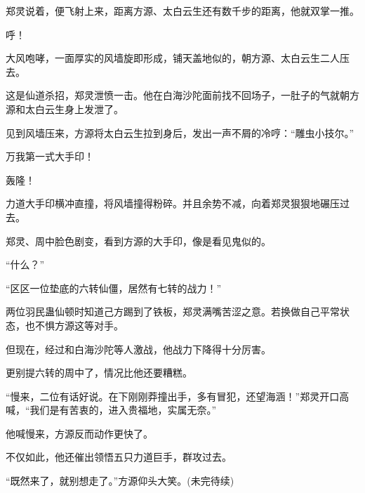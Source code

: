 \begin{this_body}
郑灵说着，便飞射上来，距离方源、太白云生还有数千步的距离，他就双掌一推。

呼！

大风咆哮，一面厚实的风墙旋即形成，铺天盖地似的，朝方源、太白云生二人压去。

这是仙道杀招，郑灵泄愤一击。他在白海沙陀面前找不回场子，一肚子的气就朝方源和太白云生身上发泄了。

见到风墙压来，方源将太白云生拉到身后，发出一声不屑的冷哼：“雕虫小技尔。”

万我第一式大手印！

轰隆！

力道大手印横冲直撞，将风墙撞得粉碎。并且余势不减，向着郑灵狠狠地碾压过去。

郑灵、周中脸色剧变，看到方源的大手印，像是看见鬼似的。

“什么？”

“区区一位垫底的六转仙僵，居然有七转的战力！”

两位羽民蛊仙顿时知道己方踢到了铁板，郑灵满嘴苦涩之意。若换做自己平常状态，也不惧方源这等对手。

但现在，经过和白海沙陀等人激战，他战力下降得十分厉害。

更别提六转的周中了，情况比他还要糟糕。

“慢来，二位有话好说。在下刚刚莽撞出手，多有冒犯，还望海涵！”郑灵开口高喊，“我们是有苦衷的，进入贵福地，实属无奈。”

他喊慢来，方源反而动作更快了。

不仅如此，他还催出领悟五只力道巨手，群攻过去。

“既然来了，就别想走了。”方源仰头大笑。(未完待续)

\end{this_body}

